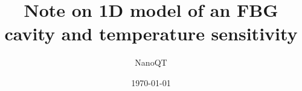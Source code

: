 \documentclass[aps,pra, onecolumn,superscriptaddress,nopacs,floatfix, showkeys, notitlepage]{revtex4-1}
\begin{document}
\title{Note on 1D model of an FBG cavity and temperature sensitivity}
\author{NanoQT}
\date{\today}

\begin{abstract}
\textcolor{red}{}
\end{abstract}


\maketitle





\end{document}
